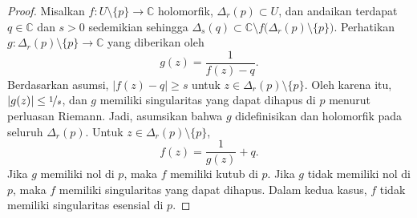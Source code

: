 \documentclass[12pt,openany]{book}
\newcommand{\sabs}[1]{\lvert {#1} \rvert}
\newcommand{\C}{{\mathbb{C}}}
\theoremstyle{plain}
\theoremstyle{remark}
\theoremstyle{definition}
\theoremstyle{exercise}
\theoremstyle{example}
\begin{document}
\begin{proof}
Misalkan $f \colon U \setminus \{ p \} \to \C$ holomorfik,
$\Delta_r(p) \subset U$,
dan andaikan
terdapat $q \in \C$ dan $s > 0$ sedemikian sehingga $\Delta_s(q) \subset \C
\setminus
f\bigl(\Delta_r(p) \setminus \{ p \} \bigr)$.
Perhatikan $g \colon \Delta_r(p) \setminus \{p\} \to \C$ yang diberikan oleh
\begin{equation*}
g(z) = \frac{1}{f(z) - q} .
\end{equation*}
Berdasarkan asumsi, $\sabs{f(z)-q} \geq s$ untuk $z \in \Delta_r(p) \setminus
\{p\}$.
Oleh karena itu, $\sabs{g(z)} \leq \nicefrac{1}{s}$, dan $g$ memiliki singularitas
yang dapat dihapus di $p$ menurut perluasan Riemann. Jadi,
asumsikan bahwa $g$ didefinisikan dan holomorfik pada seluruh
$\Delta_r(p)$. Untuk $z \in \Delta_r(p) \setminus \{ p \}$,
\begin{equation*}
f(z) = \frac{1}{g(z)} + q .
\end{equation*}
Jika $g$ memiliki nol di $p$, maka $f$ memiliki kutub di $p$. Jika $g$ tidak
memiliki nol di $p$, maka $f$ memiliki singularitas yang dapat dihapus. Dalam kedua kasus,
$f$ tidak memiliki singularitas esensial di $p$.
\end{proof}
\end{document}
